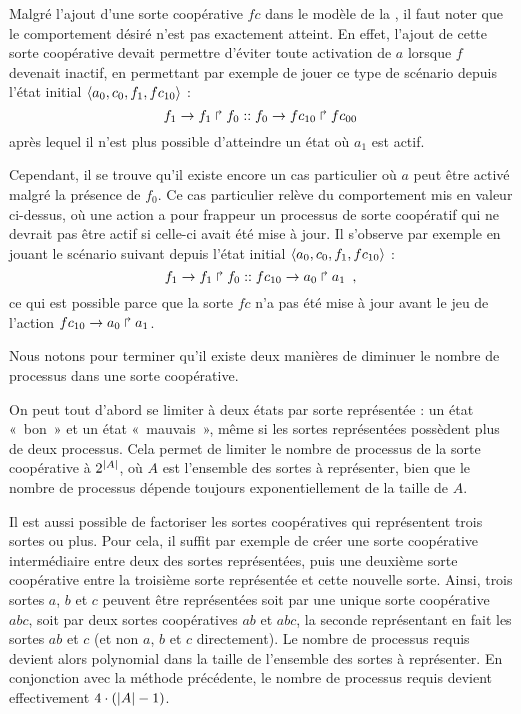\begin{example}
  Malgré l'ajout d'une sorte coopérative $fc$ dans le modèle
  de la ,
  il faut noter que le comportement désiré n'est pas exactement atteint.
  En effet, l'ajout de cette sorte coopérative devait permettre d'éviter toute activation de $a$
  lorsque $f$ devenait inactif, en permettant par exemple de jouer ce type de scénario
  depuis l'état initial $\mbox{$\langle a_0, c_0, f_1, fc_{10} \rangle$}$ :
    \[f_1\rightarrow f_1\Rsh f_0 :: f_0\rightarrow fc_{10}\Rsh fc_{00}\]
  après lequel il n'est plus possible d'atteindre un état où $a_1$ est actif.
  
  Cependant, il se trouve qu'il existe encore un cas particulier où $a$ peut être activé
  malgré la présence de $f_0$.
  Ce cas particulier relève du comportement mis en valeur ci-dessus,
  où une action a pour frappeur un processus de sorte coopératif qui ne devrait pas être
  actif si celle-ci avait été mise à jour.
  Il s'observe par exemple en jouant le scénario suivant depuis l'état initial
  $\mbox{$\langle a_0, c_0, f_1, fc_{10} \rangle$}$ :
    \[f_1\rightarrow f_1\Rsh f_0 :: fc_{10}\rightarrow a_0\Rsh a_1 \enspace,\]
  ce qui est possible parce que la sorte $fc$ n'a pas été mise à jour avant le jeu
  de l'action $fc_{10}\rightarrow a_0\Rsh a_1$.
\end{example}

\myskip

Nous notons pour terminer qu'il existe deux manières de diminuer le nombre
de processus dans une sorte coopérative.

On peut tout d'abord se limiter à deux états par sorte représentée :
un état «~bon~» et un état «~mauvais~»,
même si les sortes représentées possèdent plus de deux processus.
Cela permet de limiter le nombre de processus de la sorte coopérative à
$2^{|A|}$, où $A$ est l'ensemble des sortes à représenter,
bien que le nombre de processus dépende toujours exponentiellement de la taille de $A$.

\label{factorisation-coop}
Il est aussi possible de factoriser les sortes coopératives
qui représentent trois sortes ou plus.
Pour cela, il suffit par exemple de créer une sorte coopérative intermédiaire entre deux des
sortes représentées, puis une deuxième sorte coopérative entre
la troisième sorte représentée et cette nouvelle sorte.
Ainsi, trois sortes $a$, $b$ et $c$ peuvent être représentées soit par une unique
sorte coopérative $abc$, soit par deux sortes coopératives
$ab$ et $abc$, la seconde représentant en fait les sortes $ab$ et $c$
(et non $a$, $b$ et $c$ directement).
Le nombre de processus requis devient alors polynomial dans la taille de l'ensemble
des sortes à représenter.
En conjonction avec la méthode précédente, le nombre de processus requis devient effectivement
$4 \cdot (|A| - 1)$.



